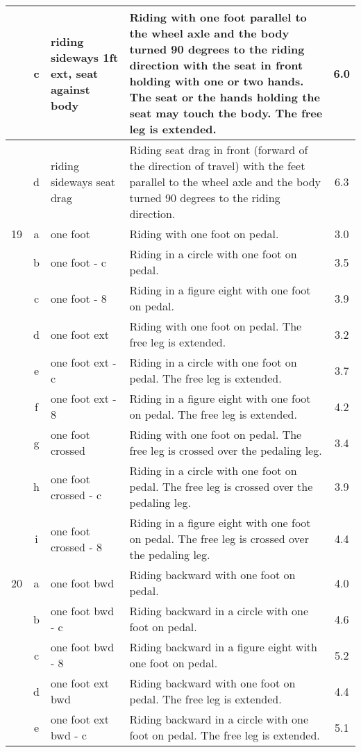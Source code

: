 \begin{longtable}{|r|c|p{4cm}|p{8cm}|c|}
\hline
  & c & riding sideways 1ft ext, seat against body  & Riding with one foot parallel to the wheel axle and the body turned 90 degrees to the riding direction with the seat in front holding with one or two hands. The seat or the hands holding the seat may touch the body. The free leg is extended. & 6.0 \\ 
\hline
  & d & riding sideways seat drag & Riding seat drag in front (forward of the direction of travel) with the feet parallel to the wheel axle and the body turned 90 degrees to the riding direction. & 6.3 \\ 
\hline
19  & a & one foot  & Riding with one foot on pedal.  & 3.0 \\ 
\hline
  & b & one foot - c  & Riding in a circle with one foot on pedal.  & 3.5 \\ 
\hline
  & c & one foot - 8  & Riding in a figure eight with one foot on pedal.  & 3.9 \\ 
\hline
  & d & one foot ext  & Riding with one foot on pedal. The free leg is extended.  & 3.2 \\ 
\hline
  & e & one foot ext - c  & Riding in a circle with one foot on pedal. The free leg is extended.  & 3.7 \\ 
\hline
  & f & one foot ext - 8  & Riding in a figure eight with one foot on pedal. The free leg is extended.  & 4.2 \\ 
\hline
  & g & one foot crossed  & Riding with one foot on pedal. The free leg is crossed over the pedaling leg. & 3.4 \\ 
\hline
  & h & one foot crossed - c  & Riding in a circle with one foot on pedal. The free leg is crossed over the pedaling leg. & 3.9 \\ 
\hline
  & i & one foot crossed - 8  & Riding in a figure eight with one foot on pedal. The free leg is crossed over the pedaling leg. & 4.4 \\ 
\hline
20  & a & one foot bwd  & Riding backward with one foot on pedal. & 4.0 \\ 
\hline
  & b & one foot bwd - c  & Riding backward in a circle with one foot on pedal. & 4.6 \\ 
\hline
  & c & one foot bwd - 8  & Riding backward in a figure eight with one foot on pedal. & 5.2 \\ 
\hline
  & d & one foot ext bwd  & Riding backward with one foot on pedal. The free leg is extended. & 4.4 \\ 
\hline
  & e & one foot ext bwd - c  & Riding backward in a circle with one foot on pedal. The free leg is extended. & 5.1 \\ 

\end{longtable}
